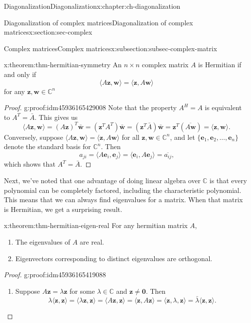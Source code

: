 \documentclass[oneside,10pt,]{book}
\numberwithin{equation}{section}
\renewcommand{\C}{\mathbb{C}}
\newcommand{\zz}{\mathbf{z}}
\newcommand{\ww}{\mathbf{w}}
\newcommand{\basis}[2]{\{\mathbf{#1}_1,\mathbf{#1}_2,\ldots,\mathbf{#1}_{#2}\}}
\begin{document}
\begin{chapterptx}{Diagonalization}{}{Diagonalization}{}{}{x:chapter:ch-diagonalization}
\begin{sectionptx}{Diagonalization of complex matrices}{}{Diagonalization of complex matrices}{}{}{x:section:sec-complex}
\begin{subsectionptx}{Complex matrices}{}{Complex matrices}{}{}{x:subsection:subsec-complex-matrix}
\begin{theorem}{}{}{x:theorem:thm-hermitian-symmetry}%
An \(n\times n\) complex matrix \(A\) is Hermitian if and only if%
\begin{equation*}
\langle A\zz,\ww\rangle = \langle \zz, A\ww\rangle
\end{equation*}
for any \(\zz,\ww\in\C^n\)%
\end{theorem}
\begin{proof}{}{g:proof:idm45936165429008}
Note that the property \(A^H=A\) is equivalent to \(A^T=\bar{A}\). This gives us%
\begin{equation*}
\langle A\zz,\ww\rangle = (A\zz)^T\bar{\ww} = (\zz^TA^T)\bar{\ww} = (\zz^T\bar{A})\bar{\ww}=\zz^T(\overline{A\ww}) = \langle \zz,\ww\rangle\text{.}
\end{equation*}
Conversely, suppose \(\langle A\zz,\ww\rangle = \langle \zz, A\ww\rangle\) for all \(\zz,\ww\in \C^n\), and let \(\basis{e}{n}\) denote the standard basis for \(\C^n\). Then%
\begin{equation*}
a_{ji}=\langle A\mathbf{e}_i,\mathbf{e}_j\rangle = \langle \mathbf{e}_i,A\mathbf{e}_j\rangle = \overline{a_{ij}}\text{,}
\end{equation*}
which shows that \(A^T=\bar{A}\).%
\end{proof}
Next, we've noted that one advantage of doing linear algebra over \(\C\) is that every polynomial can be completely factored, including the characteristic polynomial. This means that we can always find eigenvalues for a matrix. When that matrix is Hermitian, we get a surprising result.%
\begin{theorem}{}{}{x:theorem:thm-hermitian-eigen-real}%
For any hermitian matrix \(A\),%
\begin{enumerate}
\item{}The eigenvalues of \(A\) are real.%
\item{}Eigenvectors corresponding to distinct eigenvalues are orthogonal.%
\end{enumerate}
%
\end{theorem}
\begin{proof}{}{g:proof:idm45936165419088}
%
\begin{enumerate}
\item{}Suppose \(A\zz = \lambda\zz\) for some \(\lambda\in\C\) and \(\zz\neq \mathbf{0}\). Then%
\begin{equation*}
\lambda \langle \zz,\zz\rangle  = \langle \lambda\zz,\zz\rangle = \langle A\zz,\zz \rangle = \langle \zz, A\zz\rangle = \langle \zz,\lambda,\zz\rangle = \bar{\lambda}\langle \zz,\zz\rangle\text{.}

\end{equation*}
\end{enumerate}
\end{proof}
\end{subsectionptx}
\end{sectionptx}
\end{chapterptx}
\end{document}
